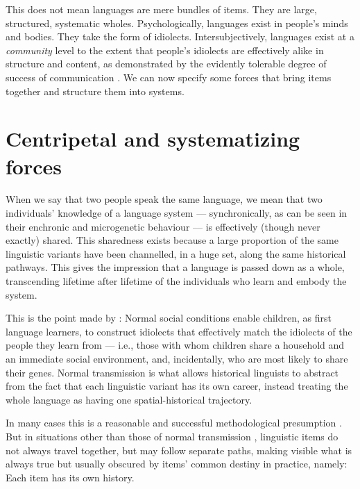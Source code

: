 This does not mean languages are mere bundles 
of items. They are large, structured, systematic wholes. Psychologically, languages exist in people's minds and bodies.
They take the form of idiolects. Intersubjectively, 
languages exist at a \textit{community} level to the extent that people's 
idiolects are effectively alike in structure and content, as 
demonstrated by the evidently tolerable degree of success 
of communication \citep{enfield_utility_2015}. We can now 
specify some forces that bring items together and structure them into 
systems.



\section{Centripetal and systematizing forces}

When we say that two people speak the same language, we mean that two individuals' knowledge of a language system --- synchronically, as can be seen in their enchronic and microgenetic behaviour --- is effectively (though never exactly) shared. This sharedness exists because a large proportion of the same linguistic variants have been channelled, in a huge set, along the same historical pathways. This gives the impression that a language is passed down as a whole, transcending lifetime after lifetime of the individuals who learn and embody the system. 



This is the point made by \citet{thomason_language_1988}: Normal social 
conditions enable children, as first language learners, to construct 
idiolects that effectively match the idiolects of the people they learn 
from --- i.e., those with whom children share a household and an immediate social 
environment, and, incidentally, who are most likely to share their 
genes. Normal transmission is what allows historical linguists to 
abstract from the fact that each linguistic variant has its own career, 
instead treating the whole language as having one 
spatial-historical trajectory.



In many cases this is a reasonable and successful methodological 
presumption \citep{haspelmath_how_2004}. But in 
situations other than those of normal transmission \citep{le_page_acts_1985,thomason_language_1988}, linguistic items do 
not always travel together, but may follow separate paths, making 
visible what is always true but usually obscured by items' common 
destiny in practice, namely: Each item has its own history. 



